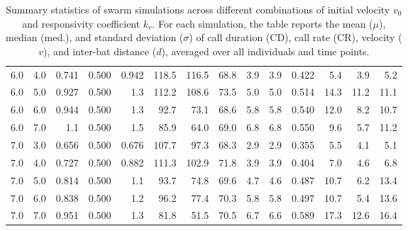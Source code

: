 \begin{table}[htbp]
\begin{tabularx}{\textwidth}{llrrrrrrrrrrrr}
6.0 & 4.0 & 0.741 & 0.500 & 0.942 & 118.5 & 116.5 & 68.8 & 3.9 & 3.9 & 0.422 & 5.4 & 3.9 & 5.2 \\
6.0 & 5.0 & 0.927 & 0.500 & 1.3 & 112.2 & 108.6 & 73.5 & 5.0 & 5.0 & 0.514 & 14.3 & 11.2 & 11.1 \\
6.0 & 6.0 & 0.944 & 0.500 & 1.3 & 92.7 & 73.1 & 68.6 & 5.8 & 5.8 & 0.540 & 12.0 & 8.2 & 10.7 \\
6.0 & 7.0 & 1.1 & 0.500 & 1.5 & 85.9 & 64.0 & 69.0 & 6.8 & 6.8 & 0.550 & 9.6 & 5.7 & 11.2 \\
7.0 & 3.0 & 0.656 & 0.500 & 0.676 & 107.7 & 97.3 & 68.3 & 2.9 & 2.9 & 0.355 & 5.5 & 4.1 & 5.1 \\
7.0 & 4.0 & 0.727 & 0.500 & 0.882 & 111.3 & 102.9 & 71.8 & 3.9 & 3.9 & 0.404 & 7.0 & 4.6 & 6.8 \\
7.0 & 5.0 & 0.814 & 0.500 & 1.1 & 93.7 & 74.8 & 69.6 & 4.7 & 4.6 & 0.487 & 10.7 & 6.2 & 13.4 \\
7.0 & 6.0 & 0.838 & 0.500 & 1.2 & 96.2 & 77.4 & 70.3 & 5.8 & 5.8 & 0.497 & 10.7 & 5.4 & 13.6 \\
7.0 & 7.0 & 0.951 & 0.500 & 1.3 & 81.8 & 51.5 & 70.5 & 6.7 & 6.6 & 0.589 & 17.3 & 12.6 & 16.4 \\
\bottomrule
\end{tabularx}
\caption{%
	Summary statistics of swarm simulations across different combinations of initial velocity $v_0$ and responsivity coefficient $k_r$. For each simulation, the table reports the mean ($\mu$), median (med.), and standard deviation ($\sigma$) of call duration (CD), call rate (CR), velocity ($v$), and inter-bat distance ($d$), averaged over all individuals and time points.%
}
\label{tab:swarm_stats}
\end{table}

